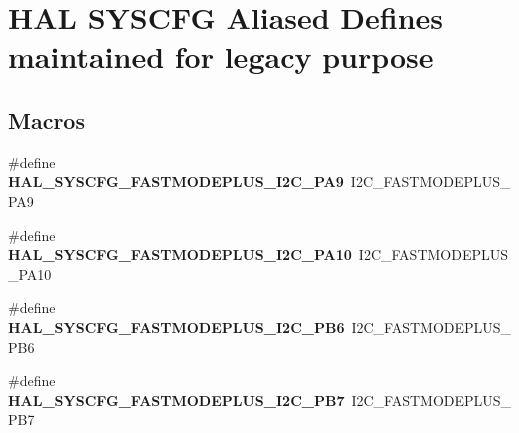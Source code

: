 \hypertarget{group___h_a_l___s_y_s_c_f_g___aliased___defines}{}\section{H\+AL S\+Y\+S\+C\+FG Aliased Defines maintained for legacy purpose}
\label{group___h_a_l___s_y_s_c_f_g___aliased___defines}
\subsection*{Macros}
\begin{DoxyCompactItemize}
\item 
\mbox{\label{group___h_a_l___s_y_s_c_f_g___aliased___defines_gab49ca938ca8481b3bd783423f840c1bd}} 
\#define {\bfseries H\+A\+L\+\_\+\+S\+Y\+S\+C\+F\+G\+\_\+\+F\+A\+S\+T\+M\+O\+D\+E\+P\+L\+U\+S\+\_\+\+I2\+C\+\_\+\+P\+A9}~I2\+C\+\_\+\+F\+A\+S\+T\+M\+O\+D\+E\+P\+L\+U\+S\+\_\+\+P\+A9
\item 
\mbox{\label{group___h_a_l___s_y_s_c_f_g___aliased___defines_ga51ca865a9860b7a43fbb46fb768e3657}} 
\#define {\bfseries H\+A\+L\+\_\+\+S\+Y\+S\+C\+F\+G\+\_\+\+F\+A\+S\+T\+M\+O\+D\+E\+P\+L\+U\+S\+\_\+\+I2\+C\+\_\+\+P\+A10}~I2\+C\+\_\+\+F\+A\+S\+T\+M\+O\+D\+E\+P\+L\+U\+S\+\_\+\+P\+A10
\item 
\mbox{\label{group___h_a_l___s_y_s_c_f_g___aliased___defines_ga615cfdee08ad61f7b1581775e4e0385e}} 
\#define {\bfseries H\+A\+L\+\_\+\+S\+Y\+S\+C\+F\+G\+\_\+\+F\+A\+S\+T\+M\+O\+D\+E\+P\+L\+U\+S\+\_\+\+I2\+C\+\_\+\+P\+B6}~I2\+C\+\_\+\+F\+A\+S\+T\+M\+O\+D\+E\+P\+L\+U\+S\+\_\+\+P\+B6
\item 
\mbox{\label{group___h_a_l___s_y_s_c_f_g___aliased___defines_gaacdf5fce976c3d425f3aac760f4dc90d}} 
\#define {\bfseries H\+A\+L\+\_\+\+S\+Y\+S\+C\+F\+G\+\_\+\+F\+A\+S\+T\+M\+O\+D\+E\+P\+L\+U\+S\+\_\+\+I2\+C\+\_\+\+P\+B7}~I2\+C\+\_\+\+F\+A\+S\+T\+M\+O\+D\+E\+P\+L\+U\+S\+\_\+\+P\+B7
\item 
\mbox{\label{group___h_a_l___s_y_s_c_f_g___aliased___defines_gad8342aebd8090a8777d84165d5726b62}} 

\end{DoxyCompactItemize}
